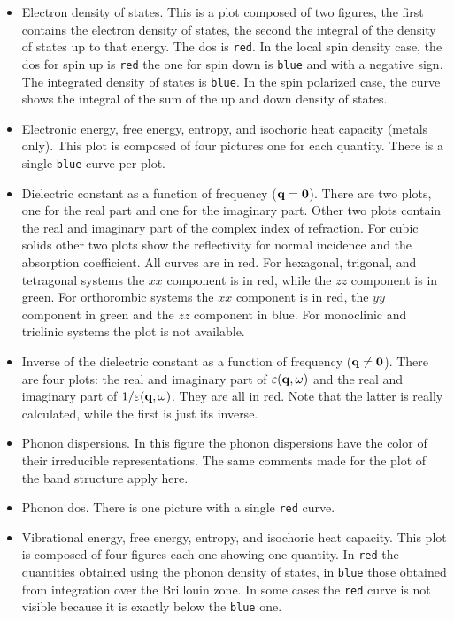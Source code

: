 \documentclass[12pt,a4paper,twoside]{report}
\begin{document}
\begin{itemize}
\item
Electron density of states. This is a plot composed of two figures,
the first contains the electron density of states, the second the integral
of the density of states up to that energy. The dos is \texttt{red}.
In the local spin density case, the dos for spin up is \texttt{red} the
one for spin down is \texttt{blue} and with a negative sign.          
The integrated density of states is \texttt{blue}. In the spin polarized
case, the curve shows the integral of the sum of the up and down density 
of states.

\item
Electronic energy, free energy, entropy, and isochoric heat capacity 
(metals only). This plot is composed of four pictures one for each
quantity. There is a single \texttt{blue} curve per plot.      

\item
Dielectric constant as a function of frequency (${\bf q}={\bf 0}$). There are 
two plots, one for the real part and one for the imaginary part. 
Other two plots contain the real and imaginary part of the complex index
of refraction. For cubic solids other two plots show the reflectivity
for normal incidence and the absorption coefficient.
All curves are in red. For hexagonal, trigonal, and tetragonal 
systems the $xx$ component is in red, while the $zz$ component is in green. 
For orthorombic systems the $xx$ component is in red, the $yy$ component in 
green and the $zz$ component in blue. For monoclinic and triclinic
systems the plot is not available.

\item
Inverse of the dielectric constant as a function of frequency 
(${\bf q}\neq {\bf 0}$). There are four plots: the real and imaginary part of 
$\varepsilon({\bf q},\omega)$ and the real and imaginary part of 
$1/\varepsilon({\bf q},\omega)$. They are all in red. Note that the latter
is really calculated, while the first is just its inverse. 

\item
Phonon dispersions. In this figure the phonon dispersions have the color 
of their irreducible representations. The same comments made for the plot of 
the band structure apply here.                       

\item
Phonon dos. There is one picture with a single \texttt{red} curve.  
   
\item
Vibrational energy, free energy, entropy, and isochoric heat capacity. This plot
is composed of four figures each one showing one quantity. In \texttt{red} the 
quantities obtained using the phonon density of states, 
in \texttt{blue} those obtained from integration over 
the Brillouin zone. In some cases the \texttt{red} curve is not visible 
because it is exactly below the \texttt{blue} one.


\end{itemize}
\end{document}
